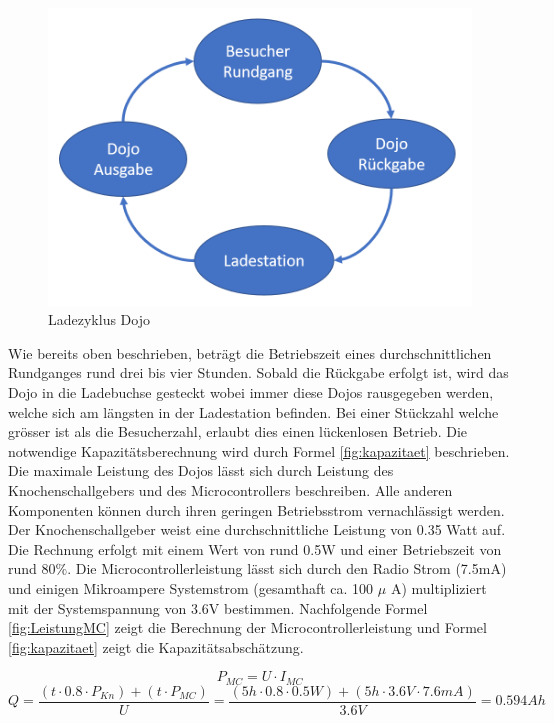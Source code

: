\begin{figure}[H]
	\begin{center}
		\includegraphics[width=120mm]{data/LadezyklusDojo.png}
		\caption{Ladezyklus Dojo} %
		\label{fig:Ladezyklus Dojo}
	\end{center}
\end{figure}

Wie bereits oben beschrieben, beträgt die Betriebszeit eines durchschnittlichen Rundganges rund drei bis vier Stunden. Sobald die Rückgabe erfolgt ist, wird das Dojo in die Ladebuchse gesteckt wobei immer diese Dojos rausgegeben werden, welche sich am längsten in der Ladestation befinden. Bei einer Stückzahl welche grösser ist als die Besucherzahl, erlaubt dies einen lückenlosen Betrieb.
Die notwendige Kapazitätsberechnung wird durch Formel \ref{fig:kapazitaet} beschrieben. Die maximale Leistung des Dojos lässt sich durch Leistung des Knochenschallgebers und des Microcontrollers beschreiben. Alle anderen Komponenten können durch ihren geringen Betriebsstrom vernachlässigt werden. Der Knochenschallgeber weist eine durchschnittliche Leistung von 0.35 Watt auf. Die Rechnung erfolgt mit einem Wert von rund 0.5W und einer Betriebszeit von rund 80$\%$. Die Microcontrollerleistung lässt sich durch den Radio Strom (7.5mA) und einigen Mikroampere Systemstrom (gesamthaft ca. 100 $\mu$ A) multipliziert mit der Systemspannung von 3.6V bestimmen. Nachfolgende Formel \ref{fig:LeistungMC} zeigt die Berechnung der Microcontrollerleistung und Formel \ref{fig:kapazitaet} zeigt die Kapazitätsabschätzung.

\begin{equation}
P_{MC}=U\cdot I_{MC}
\label{fig:LeistungMC}
\end{equation}
\begin{equation}
Q=\frac{\left(t\cdot 0.8\cdot P_{Kn}\right)+\left(t\cdot P_{MC}\right)}{U}=\frac{\left(5h\cdot 0.8\cdot 0.5W\right)+\left(5h\cdot 3.6V\cdot 7.6mA\right)}{3.6V}=0.594Ah
\label{fig:kapazitaet}
\end{equation}

